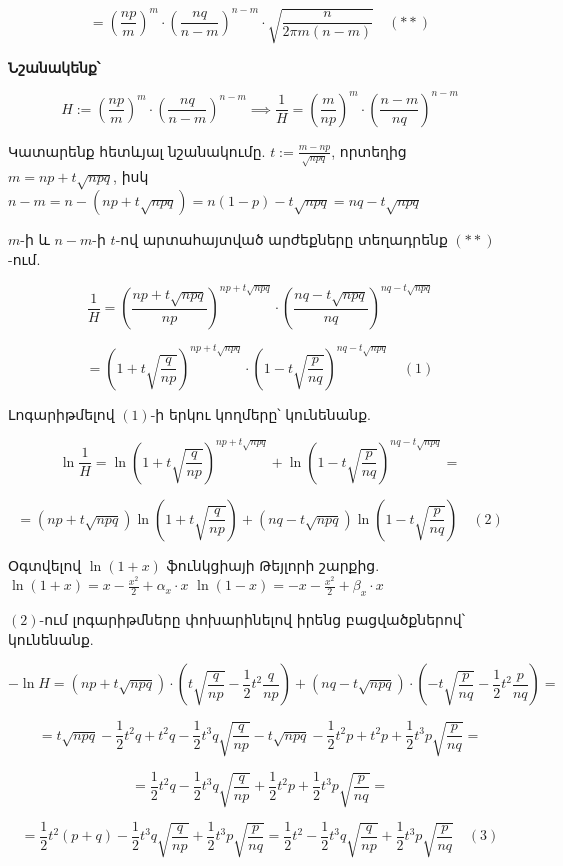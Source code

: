 \documentclass[12pt, a4paper]{article}
\begin{document}
$$= \left( \frac{np}{m} \right)^m \cdot \left( \frac{nq}{n-m} \right)^{n-m} \cdot \sqrt{\frac{n}{2\pi m(n-m)}} \quad (**)$$

\textbf{Նշանակենք՝}

$$H := \left( \frac{np}{m} \right)^m \cdot \left( \frac{nq}{n-m} \right)^{n-m} \implies \frac{1}{H} = \left( \frac{m}{np} \right)^m \cdot \left( \frac{n-m}{nq} \right)^{n-m}$$

Կատարենք հետևյալ նշանակումը.
$t := \frac{m-np}{\sqrt{npq}}$, որտեղից $m = np + t\sqrt{npq}$, իսկ
$n-m = n - (np + t\sqrt{npq}) = n(1-p) - t\sqrt{npq} = nq - t\sqrt{npq}$

$m$-ի և $n-m$-ի $t$-ով արտահայտված արժեքները տեղադրենք $(**)$-ում.

$$\frac{1}{H} = \left( \frac{np + t\sqrt{npq}}{np} \right)^{np + t\sqrt{npq}} \cdot \left( \frac{nq - t\sqrt{npq}}{nq} \right)^{nq - t\sqrt{npq}}$$

$$= \left( 1 + t\sqrt{\frac{q}{np}} \right)^{np + t\sqrt{npq}} \cdot \left( 1 - t\sqrt{\frac{p}{nq}} \right)^{nq - t\sqrt{npq}} \quad (1)$$

Լոգարիթմելով $(1)$-ի երկու կողմերը՝ կունենանք.

$$\ln \frac{1}{H} = \ln \left( 1 + t\sqrt{\frac{q}{np}} \right)^{np + t\sqrt{npq}} + \ln \left( 1 - t\sqrt{\frac{p}{nq}} \right)^{nq - t\sqrt{npq}} = $$

$$= (np + t\sqrt{npq}) \ln \left( 1 + t\sqrt{\frac{q}{np}} \right) + (nq - t\sqrt{npq}) \ln \left( 1 - t\sqrt{\frac{p}{nq}} \right) \quad (2)$$

Օգտվելով $\ln(1+x)$ ֆունկցիայի Թեյլորի շարքից.
$\ln(1+x) = x - \frac{x^2}{2} + \alpha_x \cdot x$
$\ln(1-x) = -x - \frac{x^2}{2} + \beta_x \cdot x$

$(2)$-ում լոգարիթմները փոխարինելով իրենց բացվածքներով՝ կունենանք.

$$-\ln H = (np + t\sqrt{npq}) \cdot \left( t\sqrt{\frac{q}{np}} - \frac{1}{2} t^2 \frac{q}{np} \right) + (nq - t\sqrt{npq}) \cdot \left( -t\sqrt{\frac{p}{nq}} - \frac{1}{2} t^2 \frac{p}{nq} \right) = $$

$$= t\sqrt{npq} - \frac{1}{2} t^2 q + t^2 q - \frac{1}{2} t^3 q \sqrt{\frac{q}{np}} - t\sqrt{npq} - \frac{1}{2} t^2 p + t^2 p + \frac{1}{2} t^3 p \sqrt{\frac{p}{nq}} = $$

$$= \frac{1}{2} t^2 q - \frac{1}{2} t^3 q \sqrt{\frac{q}{np}} + \frac{1}{2} t^2 p + \frac{1}{2} t^3 p \sqrt{\frac{p}{nq}} = $$

$$= \frac{1}{2} t^2 (p+q) - \frac{1}{2} t^3 q \sqrt{\frac{q}{np}} + \frac{1}{2} t^3 p \sqrt{\frac{p}{nq}} = \frac{1}{2} t^2 - \frac{1}{2} t^3 q \sqrt{\frac{q}{np}} + \frac{1}{2} t^3 p \sqrt{\frac{p}{nq}} \quad (3)$$
\end{document}
